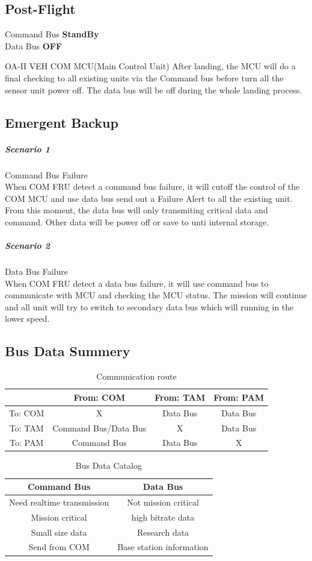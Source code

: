 \documentclass[12pt,article]{memoir}
\begin{document}
\subsection{Post-Flight}
\begin{center}
Command Bus \textbf{StandBy}\\
Data Bus \textbf{OFF}
\end{center}OA-II VEH COM MCU(Main Control Unit)
After landing, the MCU will do a final checking to all existing units via the Command bus before turn all the sensor unit power off. The data bus will be off during the whole landing process.
\subsection{Emergent Backup}
\subparagraph{Scenario 1}Command Bus Failure \\
When COM FRU detect a command bus failure, it will cutoff the control of the COM MCU and use data bus send out a Failure Alert to all the existing unit. From this moment, the data bus will only transmiting critical data and command. Other data will be power off or save to unti internal storage.
\subparagraph{Scenario 2 }Data Bus Failure \\
When COM FRU detect a data bus failure, it will use command bus to communicate with MCU and checking the MCU status. The mission will continue and all unit will try to switch to secondary data bus which will running in the lower speed. 

\subsection{Bus Data Summery}
\begin{table}[H]
	\centering
		\begin{tabu}{ c | c | c | c }
		& From: COM & From: TAM & From: PAM \\ \hline
		To: COM & X & Data Bus & Data Bus \\ \hline
		To: TAM & Command Bus/Data Bus & X & Data Bus \\ \hline
		To: PAM & Command Bus & Data Bus & X \\ \hline
		\end{tabu}
	\caption{Communication route}
	\label{tab:socs}
\end{table}
\begin{table}[H]
	\centering
		\begin{tabu}{ c | c }
		Command Bus & Data Bus\\ \hline
		Need realtime transmission & Not mission critical\\
		Mission critical & high bitrate data\\
		Small size data & Research data\\
		Send from COM & Base station information\\
		\end{tabu}
	\caption{Bus Data Catalog}
	\label{tab:socs}
\end{table}
\clearpage
\end{document}

